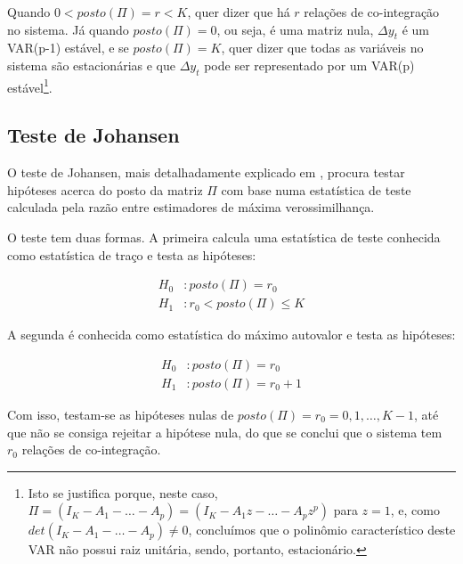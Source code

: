 \documentclass[a4paper,
               article,
               12pt,
               openany,
               oneside,
               english,
               brazil]{abntex2}
\numberwithin{equation}{section}
\begin{document}
   Quando $ 0 < posto(\Pi) = r < K $, quer dizer que há $ r $ relações de co-integração no sistema. Já quando $ posto(\Pi) = 0 $, ou seja, é uma matriz nula, $ \Delta y_t $ é um VAR(p-1) estável, e se $ posto(\Pi) = K $, quer dizer que todas as variáveis no sistema são estacionárias e que $ \Delta y_t $ pode ser representado por um VAR(p) estável\footnote{Isto se justifica porque, neste caso, $ \Pi = (I_K - A_1 - \dots - A_p) = (I_K - A_1z - \dots - A_pz^p) $ para $ z = 1 $, e, como $ det(I_K - A_1 - \dots - A_p) \neq 0 $, concluímos que o polinômio característico deste VAR não possui raiz unitária, sendo, portanto, estacionário.}.

   \subsection{Teste de Johansen}

   O teste de Johansen, mais detalhadamente explicado em , procura testar hipóteses acerca do posto da matriz $ \Pi $ com base numa estatística de teste calculada pela razão entre estimadores de máxima verossimilhança.

   O teste tem duas formas. A primeira calcula uma estatística de teste conhecida como estatística de traço e testa as hipóteses:

   \begin{equation}
       \label{trace}
       \begin{aligned}
           H_0&: posto(\Pi) = r_0 \\
           H_1&: r_0 < posto(\Pi) \leq K
       \end{aligned}
   \end{equation}

   A segunda é conhecida como estatística do máximo autovalor e testa as hipóteses:

   \begin{equation}
       \label{trace}
       \begin{aligned}
           H_0&: posto(\Pi) = r_0 \\
           H_1&: posto(\Pi) = r_0 + 1
       \end{aligned}
   \end{equation}

   Com isso, testam-se as hipóteses nulas de $ posto(\Pi) = r_0 = 0, 1, \dots, K-1 $, até que não se consiga rejeitar a hipótese nula, do que se conclui que o sistema tem $ r_0 $ relações de co-integração.
\end{document}
